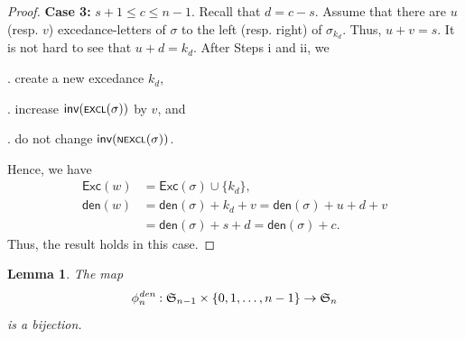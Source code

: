 \documentclass[12pt]{article}
\newtheorem{lemma}{Lemma}[section]
\begin{document}
\begin{proof}
\noindent \textbf{Case 3:} $s+1\leq c\leq n-1$. 
Recall that $d=c-s$.
Assume that there are $u$ (resp. $v$) excedance-letters of $\sigma$ to the left (resp. right) of  $\sigma_{k_{d}}$.
Thus, $u+v=s$.
It is not hard to see that $u+d=k_{d}$.
After Steps i and ii, we 

. create a new excedance $k_{d}$,

. increase $\textsf{inv}(\textsf{\scriptsize{EXCL}}(\sigma))$ by $v$, and

. do not change $\textsf{inv}(\textsf{\scriptsize{NEXCL}}(\sigma))$.

\noindent Hence, we have
\vspace{-8pt}
\begin{align*}
\textsf{Exc}(w)&=\textsf{Exc}(\sigma)\cup\{k_{d}\}, \\
\textsf{den}(w)&=\textsf{den}(\sigma)+k_{d}+v=\textsf{den}(\sigma)+u+d+v\\
&=\textsf{den}(\sigma)+s+d=\textsf{den}(\sigma)+c.
\end{align*}
Thus, the result holds in this case.
\end{proof}
\begin{lemma}\label{lemma:bijection}
The map 
$$\phi_{n}^{\emph{\text{den}}}: \mathfrak{S}_{n-1}\times\{0,1,\ldots,n-1\}\rightarrow\mathfrak{S}_{n}
$$
is a bijection.
\end{lemma}	
\end{document}
